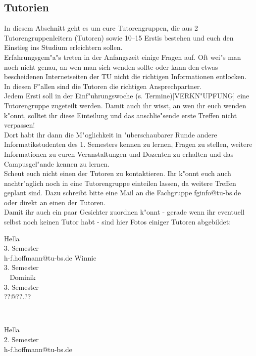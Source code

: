 \subsection{Tutorien}

In diesem Abschnitt geht es um eure Tutorengruppen, die aus 2 Tutorengruppenleitern (Tutoren) sowie 10--15 Erstis bestehen und euch den Einstieg ins Studium erleichtern sollen.\\
Erfahrungsgem"a"s treten in der Anfangszeit einige Fragen auf. Oft wei"s man noch nicht genau, an wen man sich wenden sollte oder kann den etwas bescheidenen Internetseiten der TU nicht die richtigen Informationen entlocken. In diesen F"allen sind die Tutoren die richtigen Ansprechpartner.\\
Jedem Ersti soll in der Einf"uhrungswoche (s. Termine)[VERKN"UPFUNG] eine Tutorengruppe zugeteilt werden. Damit auch ihr wisst, an wen ihr euch wenden k"onnt, solltet ihr diese Einteilung und das anschlie"sende erste Treffen nicht verpassen!\\
Dort habt ihr dann die M"oglichkeit in "uberschaubarer Runde andere Informatikstudenten des 1. Semesters kennen zu lernen, Fragen zu stellen, weitere Informationen zu euren Veranstaltungen und Dozenten zu erhalten und das Campusgel"ande kennen zu lernen.\\
Scheut euch nicht einen der Tutoren zu kontaktieren. Ihr k"onnt euch auch nachtr"aglich noch in eine Tutorengruppe einteilen lassen, da weitere Treffen geplant sind. Dazu schreibt bitte eine Mail an die Fachgruppe fginfo@tu-bs.de oder direkt an einen der Tutoren.\\
Damit ihr auch ein paar Gesichter zuordnen k"onnt - gerade wenn ihr eventuell selbst noch keinen Tutor habt - sind hier Fotos einiger Tutoren abgebildet:

\onecolumn

\captionsetup[subfloat]{singlelinecheck=off}
\captionsetup[subfloat]{justification=raggedright}
\captionsetup[subfloat]{labelformat=empty}


{Hella\\3. Semester\\h-f.hoffmann@tu-bs.de}
\hfill
{}
{Winnie\\3. Semester\\ ~ }
\hfill
{}
{Dominik\\3. Semester\\??@??.??}
\par \ \par
{}
{Hella\\2. Semester\\h-f.hoffmann@tu-bs.de}

\twocolumn